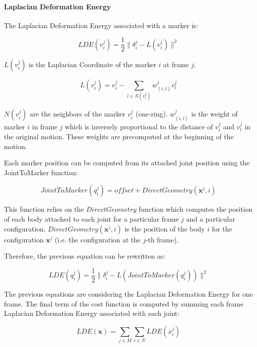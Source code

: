 \documentclass{article}
\begin{document}
\paragraph{Laplacian Deformation Energy}

The Laplacian Deformation Energy associated with a marker is:

\begin{equation}
  LDE(v_i^j) = \frac{1}{2} \| \delta_i^j - L(v_i^j) \|^2
\end{equation}


$L(v_i^j)$ is the Laplacian Coordinate of the marker $i$ at frame $j$.


\begin{equation}
  L(v_i^j) = v_i^j - \sum_{l\in N(v_i^j)} w_{(i,l)}^j v_l^j
\end{equation}


$N(v_i^j)$ are the neighbors of the marker $v_i^j$
(one-ring). $w_{(i,l)}^j$ is the weight of marker $i$ in frame $j$
which is inversely proportional to the distance of $v_i^j$ and $v_l^j$
in the original motion. These weights are precomputed at the beginning
of the motion.


Each marker position can be computed from its attached joint position
using the JointToMarker function:

\begin{equation}
  JointToMarker(q_i^j) = offset + DirectGeometry(\mathbf{x}^j, i)
\end{equation}

This function relies on the $DirectGeometry$ function which computes
the position of each body attached to each joint for a particular
frame $j$ and a particular
configuration. $DirectGeometry(\mathbf{x}^j, i)$ is the position of
the body $i$ for the configuration $\mathbf{x}^j$ (i.e. the
configuration at the $j$-th frame).


Therefore, the previous equation can be rewritten as:

\begin{equation}
  LDE(q_i^j) = \frac{1}{2} \| \delta_i^j - L(JointToMarker(q_i^j)) \|^2
\end{equation}


The previous equations are considering the Laplacian Deformation
Energy for one frame. The final term of the cost function is computed
by summing each frame Laplacian Deformation Energy associated with
each joint:


\begin{equation}
  LDE(\mathbf{x}) = \sum_{j \in M} \sum_{i \in N}  LDE(x_i^j)
\end{equation}
\end{document}
